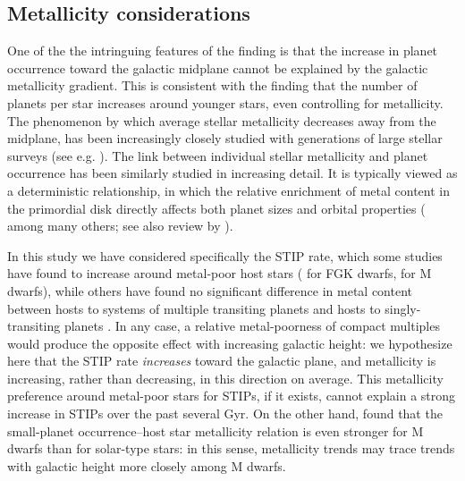 \documentclass[twocolumn]{aastex631}
\begin{document}
\subsection{Metallicity considerations}
\label{sec:metallicity}

One of the the intringuing features of the \cite{zink_scaling_2023} finding is that the increase in planet occurrence toward the galactic midplane cannot be explained by the galactic metallicity gradient. This is consistent with the \cite{yang_planets_2023} finding that the number of planets per star increases around younger stars, even controlling for metallicity. The phenomenon by which average stellar metallicity decreases away from the midplane, has been increasingly closely studied with generations of large stellar surveys (see e.g. \citealt{mayor_chemical_1976, andrievsky_using_2002, magrini_evolution_2009, luck_distribution_2011, bergemann_gaia-eso_2014, xiang_evolution_2015,yan_chemical_2019, hawkins_chemical_2023}). The link between individual stellar metallicity and planet occurrence has been similarly studied in increasing detail. It is typically viewed as a deterministic relationship, in which the relative enrichment of metal content in the primordial disk directly affects both planet sizes and orbital properties (\citealt{santos_metal-rich_2001, Fischer_2005, schlaufman_kepler_2011,Johnson10, Buchave12, Dawson13, wang_planet_2015, Brewer18, Petigura18, anderson_higher_2021, boley_first_2024, Lu20} among many others; see also review by \cite{adibekyan_star-planet_2014}). 

In this study we have considered specifically the STIP rate, which some studies have found to increase around metal-poor host stars (\citealt{Brewer18} for FGK dwarfs, \citealt{Anderson21} for M dwarfs), while others have found no significant difference in metal content between hosts to systems of multiple transiting planets and hosts to singly-transiting planets \citep{romero_no_2018, weiss_california-kepler_2018, zhu_influence_2019}. In any case, a relative metal-poorness of compact multiples would produce the opposite effect with increasing galactic height: we hypothesize here that the STIP rate \textit{increases} toward the galactic plane, and metallicity is increasing, rather than decreasing, in this direction on average. This metallicity preference around metal-poor stars for STIPs, if it exists, cannot explain a strong increase in STIPs over the past several Gyr. On the other hand, \cite{Lu20} found that the small-planet occurrence–host star metallicity relation is even stronger for M dwarfs than for solar-type stars: in this sense, metallicity trends may trace trends with galactic height more closely among M dwarfs.  
\end{document}

